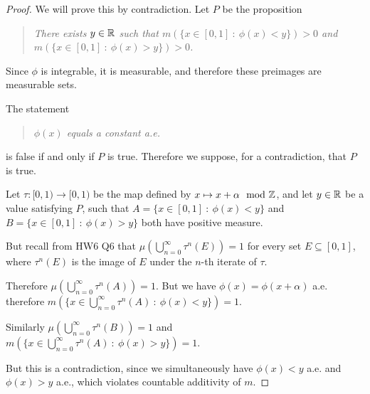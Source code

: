\begin{proof}
  We will prove this by contradiction. Let $P$ be the proposition
  \begin{quote}
    {\it There exists $y \in \mathbb{R}$ such that $m(\{x \in [0, 1] ~:~ \phi(x) < y\}) > 0$ and $m(\{x \in [0, 1] ~:~ \phi(x) > y\}) > 0$.}
  \end{quote}
  Since $\phi$ is integrable, it is measurable, and therefore these preimages are measurable sets.

  The statement
  \begin{quote}
    ​{\it $\phi(x)$ equals a constant a.e.}
  \end{quote}
  is false if and only if $P$ is true. Therefore we suppose, for a contradiction, that $P$ is true.

  Let $\tau: [0, 1) \to [0, 1)$ be the map defined by $x \mapsto x + \alpha \mod {\mathbb{Z}}$, and let $y \in \mathbb{R}$ be a
  value satisfying $P$, such that $A = \{x \in [0, 1] ~:~ \phi(x) < y\}$
  and $B = \{x \in [0, 1] ~:~ \phi(x) > y\}$ both have positive measure.

  But recall from HW6 Q6 that $\mu(\bigcup_{n=0}^\infty \tau^n(E)) = 1$ for every set $E \subseteq [0, 1]$,
  where $\tau^n(E)$ is the image of $E$ under the $n$-th iterate of $\tau$.

  Therefore $\mu(\bigcup_{n=0}^\infty \tau^n(A)) = 1$. But we have $\phi(x) = \phi(x + \alpha)$ a.e.
  therefore $m(\{x \in \bigcup_{n=0}^\infty \tau^n(A) ~:~ \phi(x) < y\}) = 1$. %

  Similarly $\mu(\bigcup_{n=0}^\infty \tau^n(B)) = 1$ and $m(\{x \in \bigcup_{n=0}^\infty \tau^n(A) ~:~ \phi(x) > y\}) = 1$.

  But this is a contradiction, since we simultaneously have $\phi(x) < y$ a.e. and $\phi(x) > y$ a.e., which
  violates countable additivity of $m$.
\end{proof}







